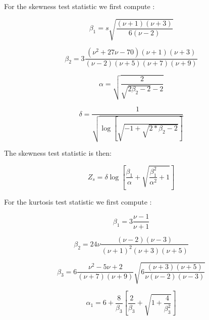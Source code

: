 \documentclass[preprint,12pt,authoryear]{elsarticle}
\begin{document}
For the skewness test statistic we first compute \citep{DAgostino1990-kp}:

\begin{equation}
\beta_1 = s \sqrt{ \frac{\left(\nu + 1\right) \left(\nu + 3\right)} {6 \left(\nu - 2\right)} }
\end{equation}

\begin{equation}
\beta_2 = 3 \frac{\left(\nu^2 + 27\nu - 70\right) \left(\nu + 1\right) \left(\nu + 3\right)} {\left(\nu - 2\right) \left(\nu + 5\right) \left(\nu + 7\right) \left(\nu + 9\right)}
\end{equation}

\begin{equation}
\alpha = \sqrt{\frac{2} {\sqrt{2 \beta_2 - 2} - 2}}
\end{equation}

\begin{equation}
\delta = \frac{1}{\sqrt{\log \left[\sqrt{-1 + \sqrt{2 * \beta_2 - 2}} \right]}}
\end{equation}

The skewness test statistic is then:

\begin{equation}
Z_s = \delta \log\left[\frac{\beta_1}{\alpha} + \sqrt{\frac{\beta_1^2}{\alpha^2} + 1} \right]
\end{equation}

For the kurtosis test statistic we first compute \citep{Anscombe1983-nz, DAgostino1990-kp}:

\begin{equation}
\beta_1 = 3 \frac{\nu - 1}{\nu + 1}
\end{equation}

\begin{equation}
\beta_2 = 24 \nu \frac{\left(\nu - 2\right)\left(\nu - 3\right)}{\left(\nu + 1\right)^2 \left(\nu + 3\right) \left(\nu + 5\right)}
\end{equation}

\begin{equation}
\beta_3 = 6 \frac{\nu^2 - 5 \nu + 2}{\left(\nu + 7\right) \left(\nu + 9\right)} \sqrt{6 \frac{\left(\nu + 3\right) \left(\nu + 5\right)}{\nu \left(\nu - 2\right) \left(\nu - 3 \right)}}
\end{equation}

\begin{equation}
\alpha_1 = 6 + \frac{8}{\beta_3} \left[\frac{2}{\beta_3} + \sqrt{1 + \frac{4}{\beta_3^2}} \right]
\end{equation}
\end{document}
